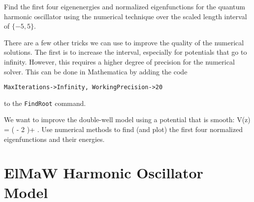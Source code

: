 \begin{exercise}
Find the first four eigenenergies and normalized eigenfunctions for the quantum harmonic oscillator using the numerical technique over the scaled length interval of $\{-5,5\}$.
\end{exercise}


There are a few other tricks we can use to improve the quality of the numerical solutions. The first is to increase the interval, especially for potentials that go to infinity. However, this requires a higher degree of precision for the numerical solver. This can be done in Mathematica by adding the code

\texttt{MaxIterations->Infinity, WorkingPrecision->20}

to the \texttt{FindRoot} command.


\begin{exercise}

We want to improve the double-well model using a potential that is smooth:
\beq
V(z) = \left( - 2 \right)+ .
\eeq
Use numerical methods to find (and plot) the first four normalized eigenfunctions and their energies.
\begin{marginfigure}
\centering
{}
\end{marginfigure}
\end{exercise}




\chapter{ElMaW Harmonic Oscillator Model}

